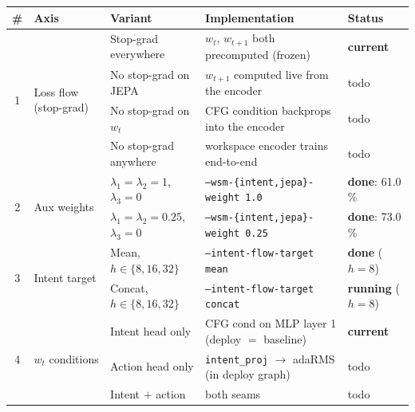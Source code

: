 %
%

\begin{table}[t]
\centering
\small
\setlength{\tabcolsep}{5pt}
\renewcommand{\arraystretch}{1.15}
\begin{tabular}{@{}cllll@{}}
\toprule
\textbf{\#} & \textbf{Axis} & \textbf{Variant} & \textbf{Implementation} & \textbf{Status} \\
\midrule

\multirow{4}{*}{1}
 & \multirow{4}{*}{Loss flow (stop-grad)}
 & Stop-grad everywhere            & $w_t$, $w_{t+1}$ both precomputed (frozen) & \textbf{current} \\
 & & No stop-grad on JEPA          & $w_{t+1}$ computed live from the encoder   & todo \\
 & & No stop-grad on $w_t$         & CFG condition backprops into the encoder   & todo \\
 & & No stop-grad anywhere         & workspace encoder trains end-to-end        & todo \\
\midrule

\multirow{2}{*}{2}
 & \multirow{2}{*}{Aux weights}
 & $\lambda_1=\lambda_2=1$, $\lambda_3=0$     & \texttt{--wsm-\{intent,jepa\}-weight 1.0}  & \textbf{done}: 61.0\,\% \\
 & & $\lambda_1=\lambda_2=0.25$, $\lambda_3=0$ & \texttt{--wsm-\{intent,jepa\}-weight 0.25} & \textbf{done}: 73.0\,\% \\
\midrule

\multirow{2}{*}{3}
 & \multirow{2}{*}{Intent target}
 & Mean, $h\in\{8,16,32\}$    & \texttt{--intent-flow-target mean}   & \textbf{done} ($h{=}8$) \\
 & & Concat, $h\in\{8,16,32\}$ & \texttt{--intent-flow-target concat} & \textbf{running} ($h{=}8$) \\
\midrule

\multirow{3}{*}{4}
 & \multirow{3}{*}{$w_t$ conditions}
 & Intent head only  & CFG cond on MLP layer 1 (deploy $=$ baseline) & \textbf{current} \\
 & & Action head only & \texttt{intent\_proj} $\to$ adaRMS (in deploy graph) & todo \\
 & & Intent $+$ action & both seams                                   & todo \\
\midrule


\end{tabular}
\end{table}

